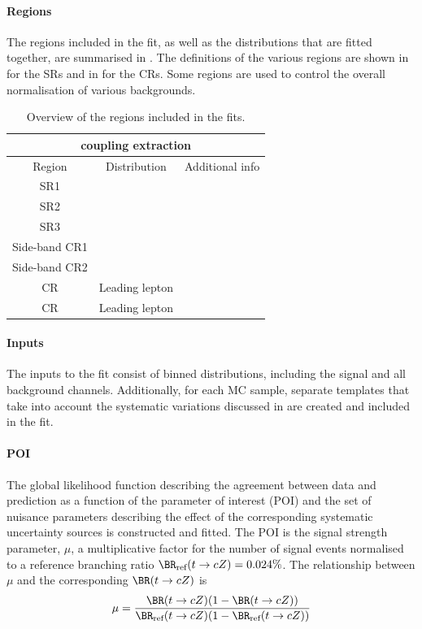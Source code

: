 \paragraph{Regions} The regions included in the fit, as well as the
distributions that are fitted together, are summarised in .
The definitions of the various regions are shown in
 for the SRs and in  for the CRs. 
Some regions are used to control the overall normalisation of various
backgrounds.

\begin{table}[htbp]
	\small
	\centering
	\begin{tabular}{ccc}
		\toprule
		\multicolumn{3}{c}{\tZc coupling extraction} \\
		\midrule
		Region & Distribution & Additional info \\
		\midrule
		SR1 \tZc & \Done & \\
		SR2 \tZc & \DtwoC & \\
		SR3 \tZc & \Dthree & \\
		Side-band CR1 \tZc & \Done & \\
		Side-band CR2 & \DtwoC & \\
		\ttZ CR & Leading lepton \pt & \\
		\ttbar CR & Leading lepton \pt & \\
		\bottomrule
	\end{tabular}
	\caption{
	Overview of the regions included in the fits.}%
\label{tab:fitregions}
\end{table}

\paragraph{Inputs} The inputs to the fit consist of binned
distributions, including the signal and all background channels.
Additionally, for each MC sample, separate templates that take into
account the systematic variations discussed in 
are created and included in the fit. 

\paragraph{POI} The global likelihood function describing the
agreement between data and prediction as a function of the parameter
of interest (POI) and the set of nuisance parameters describing the
effect of the corresponding systematic uncertainty sources is
constructed and fitted. The POI is the signal strength parameter, $\mu$,
a multiplicative factor for the number of signal events normalised to a reference branching ratio
$\BR_{\text{ref}}(t\rightarrow cZ)=0.024\%$.
The relationship between $\mu$ and the corresponding $\BR(t\rightarrow cZ)$ is
\begin{equation}
\mu=\frac{\BR(t\rightarrow cZ)(1-\BR(t\rightarrow cZ))}{\BR_{\text{ref}}(t\rightarrow cZ)(1-\BR_{\text{ref}}(t\rightarrow cZ))}
\end{equation}

